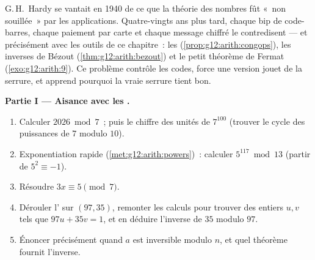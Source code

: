 \begin{problem}
\label{pb:g12:arith:1}
G.\,H.~Hardy se vantait en 1940 de ce que la théorie des nombres
fût «~non souillée~» par les applications. Quatre-vingts ans plus
tard, chaque bip de code-barres, chaque paiement par carte et chaque
message chiffré le contredisent --- et précisément avec les outils
de ce chapitre~: les  (\cref{prop:g12:arith:congops}),
les inverses de Bézout (\cref{thm:g12:arith:bezout}) et le petit
théorème de Fermat (\cref{exo:g12:arith:9}). Ce problème contrôle
les codes, force une version jouet de la serrure, et apprend
pourquoi la vraie serrure tient bon.

\medskip
\noindent\textbf{Partie I --- Aisance avec les .}
\begin{enumerate}
  \item Calculer $2026 \bmod 7$~; puis le chiffre des unités de
        $7^{100}$ (trouver le cycle des puissances de $7$ modulo
        $10$).
  \item Exponentiation rapide (\cref{met:g12:arith:powers})~:
        calculer $5^{117} \bmod 13$ (partir de
        $5^2 \equiv -1$).
  \item Résoudre $3x \equiv 5 \pmod 7$.
  \item Dérouler l' sur $(97, 35)$, remonter
        les calculs pour trouver des entiers $u, v$ tels que
        $97u + 35v = 1$, et en déduire l'inverse de $35$ modulo
        $97$.
  \item Énoncer précisément quand $a$ est inversible modulo $n$, et
        quel théorème fournit l'inverse.
\end{enumerate}


\end{problem}
